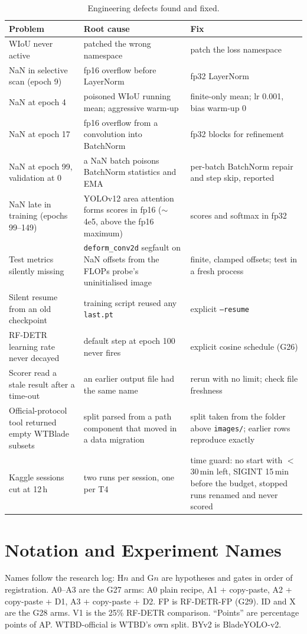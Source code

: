 \begin{table}[!htbp]
\centering
\caption{Engineering defects found and fixed.}
\label{tab:engineering}
\footnotesize
\begin{tabularx}{\textwidth}{@{}X X X@{}}
\toprule
Problem & Root cause & Fix \\
\midrule
WIoU never active & patched the wrong namespace & patch the loss namespace \\
NaN in selective scan (epoch 9) & fp16 overflow before LayerNorm & fp32 LayerNorm \\
NaN at epoch 4 & poisoned WIoU running mean; aggressive warm-up & finite-only mean; lr 0.001, bias warm-up 0 \\
NaN at epoch 17 & fp16 overflow from a convolution into BatchNorm & fp32 blocks for refinement \\
NaN at epoch 99, validation at 0 & a NaN batch poisons BatchNorm statistics and EMA & per-batch BatchNorm repair and step skip, reported \\
NaN late in training (epochs 99--149) & YOLOv12 area attention forms scores in fp16 ($\sim$4e5, above the fp16 maximum) & scores and softmax in fp32 \\
Test metrics silently missing & \texttt{deform\_conv2d} segfault on NaN offsets from the FLOPs probe's uninitialised image & finite, clamped offsets; test in a fresh process \\
Silent resume from an old checkpoint & training script reused any \texttt{last.pt} & explicit \texttt{--resume} \\
RF-DETR learning rate never decayed & default step at epoch 100 never fires & explicit cosine schedule (G26) \\
Scorer read a stale result after a time-out & an earlier output file had the same name & rerun with no limit; check file freshness \\
Official-protocol tool returned empty WTBlade subsets & split parsed from a path component that moved in a data migration & split taken from the folder above \texttt{images/}; earlier rows reproduce exactly \\
Kaggle sessions cut at 12\,h & two runs per session, one per T4 & time guard: no start with $<$30\,min left, SIGINT 15\,min before the budget, stopped runs renamed and never scored \\
\bottomrule
\end{tabularx}
\end{table}

\section{Notation and Experiment Names}
Names follow the research log: H$n$ and G$n$ are hypotheses and gates in order of registration. A0--A3 are the G27 arms: A0 plain recipe, A1 + copy-paste, A2 + copy-paste + D1, A3 + copy-paste + D2. FP is RF-DETR-FP (G29). ID and X are the G28 arms. V1 is the 25\% RF-DETR comparison. ``Points'' are percentage points of AP. WTBD-official is WTBD's own split. BYv2 is BladeYOLO-v2.

